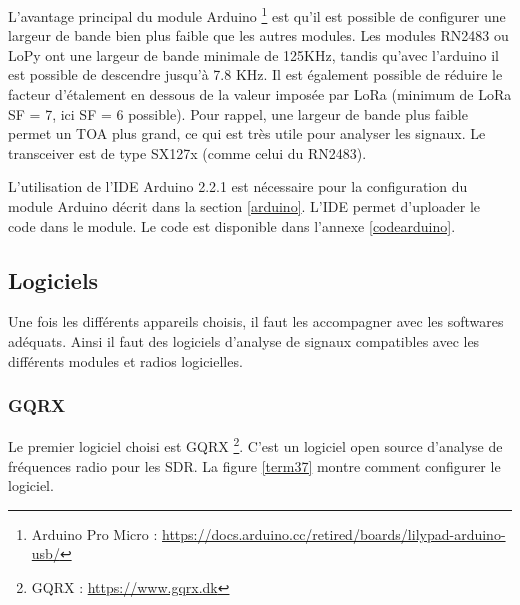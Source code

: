 L'avantage principal du module Arduino \footnote{Arduino Pro Micro : \href{https://docs.arduino.cc/retired/boards/lilypad-arduino-usb/}{https://docs.arduino.cc/retired/boards/lilypad-arduino-usb/}} est qu'il est possible de configurer une largeur de bande bien plus faible que les autres modules. Les modules RN2483 ou LoPy ont une largeur de bande minimale de 125KHz, tandis qu'avec l'arduino il est possible de descendre jusqu'à 7.8 KHz. Il est également possible de réduire le facteur d'étalement en dessous de la valeur imposée par LoRa (minimum de LoRa SF = 7, ici SF = 6 possible). Pour rappel, une largeur de bande plus faible permet un \ac{TOA} plus grand, ce qui est très utile pour analyser les signaux. Le transceiver est de type SX127x (comme celui du RN2483).

\vspace{0.1cm}

L'utilisation de l'\ac{IDE} Arduino 2.2.1 est nécessaire pour la configuration du module Arduino décrit dans la section \ref{arduino}. L'\ac{IDE} permet d'uploader le code  dans le module. Le code est disponible dans l'annexe \ref{codearduino}.

\subsection{Logiciels}\label{fft}

Une fois les différents appareils choisis, il faut les accompagner avec les softwares adéquats. Ainsi il faut des logiciels d'analyse de signaux compatibles avec les différents modules et radios logicielles.

\subsubsection{GQRX}

Le premier logiciel choisi est GQRX \footnote{GQRX : \href{https://www.gqrx.dk}{https://www.gqrx.dk}}. C'est un logiciel open source d'analyse de fréquences radio pour les SDR. La figure \ref{term37} montre comment configurer le logiciel.

